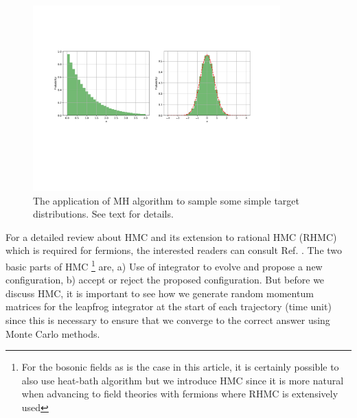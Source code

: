 \documentclass[letter,11pt]{article}
\begin{document}
\begin{figure}[htbp] 
	\centering 
	\includegraphics[width=0.85\textwidth]{figs/sampleMH1.pdf}
	\caption{\label{fig:MH11}The application of MH algorithm to sample some simple target distributions. See text for details.}
\end{figure} 



For a detailed review about HMC and its extension to rational 
HMC (RHMC) which is required for fermions, the interested readers 
can consult Ref. \cite{Hanada:2018fnp, Joseph:2019zer}. 
The two basic parts of HMC \footnote{
For the bosonic fields as is the case in this article, it is certainly possible to also use 
heat-bath algorithm but we introduce HMC since it is more natural when advancing to field theories with fermions where RHMC is extensively used}
are, a) Use of integrator to evolve and propose a 
new configuration, b) accept or reject the proposed configuration. But before we discuss HMC, 
it is important to see how we generate random momentum 
matrices for the leapfrog integrator 
at the start of each trajectory (time unit) since 
this is necessary to ensure that we converge to the 
correct answer using Monte Carlo methods. 
\end{document}
